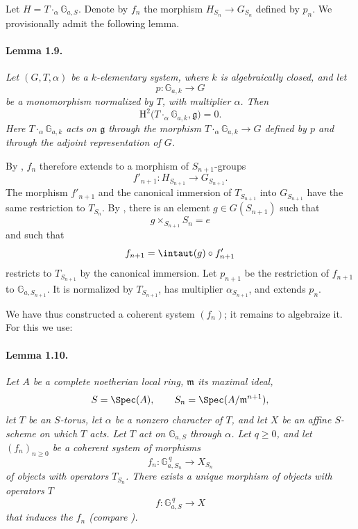 Let \(H=T\mathbin{\cdot_\alpha}\mathbb G_{a,S}\). Denote by \(f_n\)
the morphism \(H_{S_n}\to G_{S_n}\) defined by \(p_n\). We
provisionally admit the following lemma.

\paragraph{\textbf{Lemma 1.9.}}
\emph{Let \((G,T,\alpha)\) be a \(k\)-elementary system, where \(k\)
is algebraically closed, and let
\[
  p\colon\mathbb G_{a,k}\longrightarrow G
\]
be a monomorphism normalized by \(T\), with multiplier \(\alpha\).
Then}
\[
  \mathrm H^2\bigl(T\mathbin{\cdot_\alpha}\mathbb G_{a,k},
    \mathfrak g\bigr)=0.
\]
\emph{Here \(T\mathbin{\cdot_\alpha}\mathbb G_{a,k}\) acts on
\(\mathfrak g\) through the morphism
\(T\mathbin{\cdot_\alpha}\mathbb G_{a,k}\to G\) defined by \(p\)
and through the adjoint representation of \(G\).}

By , \(f_n\) therefore extends to a morphism of
\(S_{n+1}\)-groups
\[
  f'_{n+1}\colon H_{S_{n+1}}\longrightarrow G_{S_{n+1}}.
\]
The morphism \(f'_{n+1}\) and the canonical immersion of
\(T_{S_{n+1}}\) into \(G_{S_{n+1}}\) have the same restriction to
\(T_{S_n}\). By , there is an element
\(g\in G(S_{n+1})\) such that
\[
  g\times_{S_{n+1}}S_n=e
\]
and such that
\[
  f_{n+1}=\intaut(g)\circ f'_{n+1}
\]
restricts to \(T_{S_{n+1}}\) by the canonical immersion. Let
\(p_{n+1}\) be the restriction of \(f_{n+1}\) to
\(\mathbb G_{a,S_{n+1}}\). It is normalized by \(T_{S_{n+1}}\),
has multiplier \(\alpha_{S_{n+1}}\), and extends \(p_n\).

We have thus constructed a coherent system \((f_n)\); it remains to
algebraize it. For this we use:

\paragraph{\textbf{Lemma 1.10.}}
\emph{Let \(A\) be a complete noetherian local ring,
\(\mathfrak m\) its maximal ideal,
\[
  S=\Spec(A),\qquad S_n=\Spec(A/\mathfrak m^{n+1}),
\]
let \(T\) be an \(S\)-torus, let \(\alpha\) be a nonzero character
of \(T\), and let \(X\) be an affine \(S\)-scheme on which \(T\)
acts. Let \(T\) act on \(\mathbb G_{a,S}\) through \(\alpha\).
Let \(q\geq0\), and let \((f_n)_{n\geq0}\) be a coherent system of
morphisms}
\[
  f_n\colon\mathbb G_{a,S_n}^{\,q}\longrightarrow X_{S_n}
\]
\emph{of objects with operators \(T_{S_n}\). There exists a unique
morphism of objects with operators \(T\)}
\[
  f\colon\mathbb G_{a,S}^{\,q}\longrightarrow X
\]
\emph{that induces the \(f_n\) \textup{(compare )}.}


